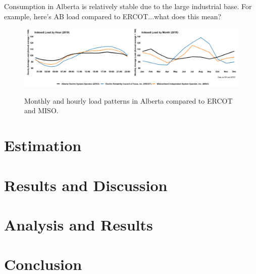\documentclass[12pt]{article}
\begin{document}
Consumption in Alberta is relatively stable due to the large industrial base. For example, here's AB load compared to ERCOT...what does this mean?

\begin{figure}[!h]%
	\centering \vspace{-.25cm} \includegraphics[width=6.5in]{../images/load_compare.png}
\label{fig:load_pattern}
\vspace{-0.75cm}	\caption{Monthly and hourly load patterns in Alberta compared to ERCOT and MISO.}
\end{figure}



\section{Estimation}


\section{Results and Discussion}




\section{Analysis and Results}

\section{Conclusion}




\end{document}

